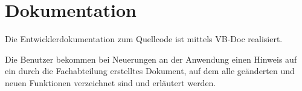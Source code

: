 \clearpage
\section{Dokumentation}
\label{sec:Dokumentation}

Die Entwicklerdokumentation zum Quellcode ist mittels \acs{VB}-Doc realisiert.

Die Benutzer bekommen bei Neuerungen an der Anwendung einen Hinweis auf ein durch die Fachabteilung erstelltes Dokument, auf dem alle geänderten und neuen Funktionen verzeichnet sind und erläutert werden. 

